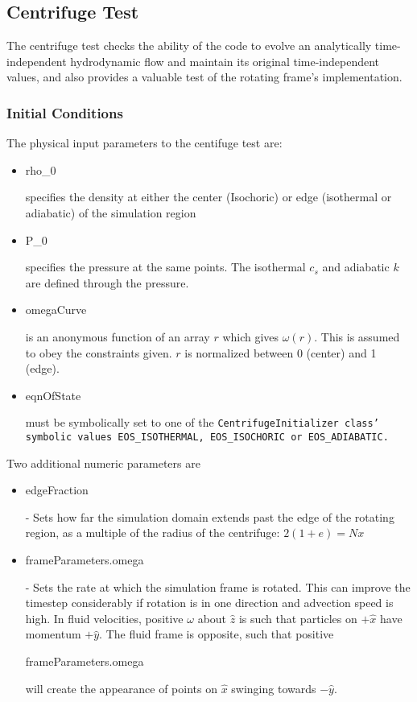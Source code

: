 

\subsection{Centrifuge Test}

The centrifuge test checks the ability of the code to evolve an analytically time-independent
hydrodynamic flow and maintain its original time-independent values, and also provides a
valuable test of the rotating frame's implementation.

\subsubsection{Initial Conditions}

The physical input parameters to the centifuge test are:
\begin{itemize}
\item \begin{tt}rho\_0\end{tt} specifies the density at either the center (Isochoric) or edge (isothermal
or adiabatic) of the simulation region
\item \begin{tt}P\_0\end{tt} specifies the pressure at the same points. The isothermal $c_s$ and adiabatic $k$
are defined through the pressure.
\item \begin{tt}omegaCurve\end{tt} is an anonymous function of an array $r$ which gives $\omega(r)$. This is 
assumed to obey the constraints given. $r$ is normalized between 0 (center) and 1 (edge).
\item \begin{tt}eqnOfState\end{tt} must be symbolically set to one of the \tt{CentrifugeInitializer} class' 
symbolic values \tt{EOS\_ISOTHERMAL}, \tt{EOS\_ISOCHORIC} or \tt{EOS\_ADIABATIC}.
\end{itemize}

Two additional numeric parameters are
\begin{itemize}
\item \begin{tt}edgeFraction\end{tt} - Sets how far the simulation domain extends past the edge of the
rotating region, as a multiple of the radius of the centrifuge: $2(1+e) = Nx$
\item \begin{tt}frameParameters.omega\end{tt} - Sets the rate at which the simulation frame is rotated. This can improve the 
timestep considerably if rotation is in one direction and advection speed is high. In fluid velocities,
positive $\omega$ about $\hat{z}$ is such that particles on $+\hat{x}$ have momentum $+\hat{y}$. The fluid frame is opposite, such
that positive \begin{tt}frameParameters.omega\end{tt} will create the appearance of points on $\hat{x}$ swinging towards $-\hat{y}$.
\end{itemize}


